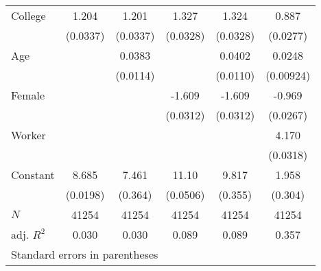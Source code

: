 \begin{tabular}{l*{5}{c}}
\hline\hline
\hline
College   &       1.204&       1.201&       1.327&       1.324&       0.887\\
          &    (0.0337)&    (0.0337)&    (0.0328)&    (0.0328)&    (0.0277)\\
Age         &            &      0.0383&            &      0.0402&      0.0248\\
            &            &    (0.0114)&            &    (0.0110)&   (0.00924)\\
Female         &            &            &      -1.609&      -1.609&      -0.969\\
            &            &            &    (0.0312)&    (0.0312)&    (0.0267)\\
Worker     &            &            &            &            &       4.170\\
             &            &            &            &            &    (0.0318)\\
Constant       &       8.685&       7.461&       11.10&       9.817&       1.958\\
            &    (0.0198)&     (0.364)&    (0.0506)&     (0.355)&     (0.304)\\
\hline
\(N\)       &       41254&       41254&       41254&       41254&       41254\\
adj. \(R^{2}\)&       0.030&       0.030&       0.089&       0.089&       0.357\\
\hline\hline
\multicolumn{6}{l}{\footnotesize Standard errors in parentheses}\\
\end{tabular}
